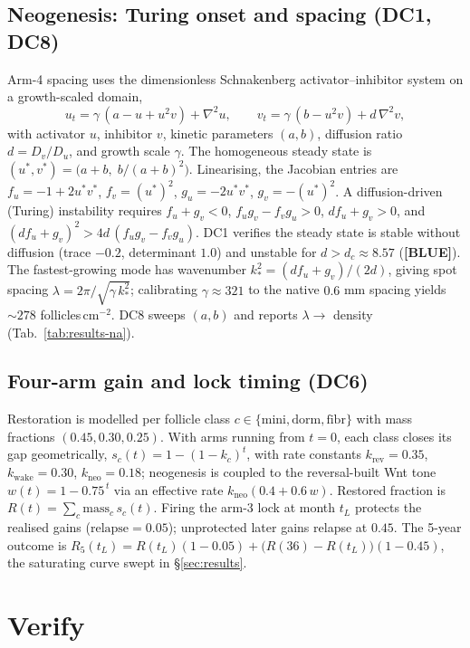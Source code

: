 \documentclass[11pt,a4paper]{article}
\newcommand{\tierbadge}[2]{\textcolor{#1}{\textbf{[#2]}}}
\providecommand{\tierBlue}{\tierbadge{blue!60!black}{BLUE}}
\begin{document}
\subsection{Neogenesis: Turing onset and spacing (DC1, DC8)}
\label{sec:method-turing}
Arm-4 spacing uses the dimensionless Schnakenberg activator--inhibitor system
\citep{schnakenberg1979} on a growth-scaled domain,
\begin{equation}
u_t = \gamma\,(a - u + u^2 v) + \nabla^2 u, \qquad
v_t = \gamma\,(b - u^2 v) + d\,\nabla^2 v,
\end{equation}
with activator $u$, inhibitor $v$, kinetic parameters $(a,b)$, diffusion ratio
$d=D_v/D_u$, and growth scale $\gamma$. The homogeneous steady state is
$(u^\ast,v^\ast)=\big(a+b,\; b/(a+b)^2\big)$. Linearising, the Jacobian entries are
$f_u=-1+2u^\ast v^\ast$, $f_v=(u^\ast)^2$, $g_u=-2u^\ast v^\ast$, $g_v=-(u^\ast)^2$.
A diffusion-driven (Turing) instability requires $f_u+g_v<0$, $f_u g_v-f_v g_u>0$,
$d f_u + g_v>0$, and $(d f_u+g_v)^2 > 4d\,(f_u g_v - f_v g_u)$. DC1 verifies the
steady state is stable without diffusion (trace $-0.2$, determinant $1.0$) and
unstable for $d>d_c\approx 8.57$ (\tierBlue). The fastest-growing mode has
wavenumber $k_\ast^2=(d f_u+g_v)/(2d)$, giving spot spacing
$\lambda = 2\pi/\sqrt{\gamma\,k_\ast^2}$; calibrating $\gamma\approx 321$ to the
native $0.6$ mm spacing yields ${\sim}278$ follicles\,cm$^{-2}$. DC8 sweeps $(a,b)$
and reports $\lambda\to$ density (Tab.~\ref{tab:results-na}).

\subsection{Four-arm gain and lock timing (DC6)}
\label{sec:method-gain}
Restoration is modelled per follicle class $c\in\{\text{mini},\text{dorm},\text{fibr}\}$
with mass fractions $(0.45,0.30,0.25)$. With arms running from $t=0$, each class
closes its gap geometrically, $s_c(t)=1-(1-k_c)^t$, with rate constants
$k_{\text{rev}}=0.35$, $k_{\text{wake}}=0.30$, $k_{\text{neo}}=0.18$; neogenesis is
coupled to the reversal-built Wnt tone $w(t)=1-0.75^{\,t}$ via an effective rate
$k_{\text{neo}}(0.4+0.6\,w)$. Restored fraction is
$R(t)=\sum_c \text{mass}_c\, s_c(t)$. Firing the arm-3 lock at month $t_L$ protects
the realised gains ($\text{relapse}=0.05$); unprotected later gains relapse at
$0.45$. The 5-year outcome is
$R_5(t_L)=R(t_L)(1-0.05)+\big(R(36)-R(t_L)\big)(1-0.45)$, the saturating curve
swept in \S\ref{sec:results}.

\section{Verify}
\label{sec:verify}
\end{document}

